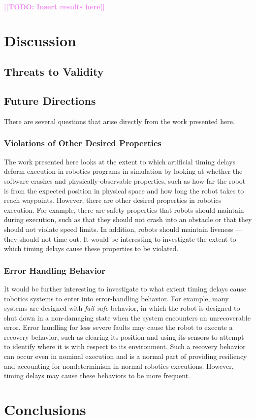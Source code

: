 \documentclass[conference]{IEEEtran}
\newcommand{\todo}[1]{\textcolor{violet}{{\bfseries [[TODO: #1]]}}}
\begin{document}
\todo{Insert results here}

\section{Discussion}

\subsection{Threats to Validity}

\subsection{Future Directions}

There are several questions that arise directly from the work presented here.

\subsubsection{Violations of Other Desired Properties}

The work presented here looks at the extent to which artificial timing delays deform execution
in robotics programs in simulation by looking at whether the software crashes
and physically-observable properties, such as how far the robot is from the expected
position in physical space and how long the robot takes to reach waypoints.
However, there are other desired properties in robotics execution.
For example, there are safety properties that robots should maintain during
execution, such as that they should not crash into an obstacle or that they
should not violate speed limits.
In addition, robots should maintain liveness --- they should not time out.
It would be interesting to investigate the extent to which timing delays cause these properties to be violated.

\subsubsection{Error Handling Behavior}

It would be further interesting to investigate to what extent timing delays cause
robotics systems to enter into error-handling behavior.
For example, many systems are designed with \emph{fail safe} behavior, in which
the robot is designed to shut down in a non-damaging state when the system encounters
an unrecoverable error.
Error handling for less severe faults may cause the robot to execute a recovery 
behavior, such as clearing its position and using its sensors to attempt to 
identify where it is with respect to its environment. 
Such a recovery behavior can occur even in nominal execution and is a normal part
of providing resiliency and accounting for nondeterminism in normal robotics executions.
However, timing delays may cause these behaviors to be more frequent.

\section{Conclusions}






\end{document}
